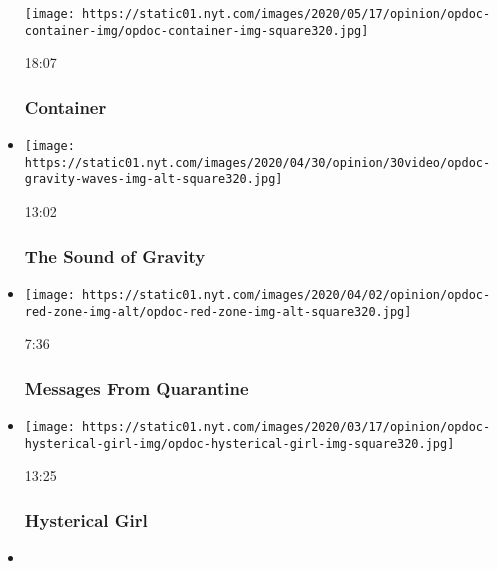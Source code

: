 \begin{itemize}
  \texttt{[image: https://static01.nyt.com/images/2020/05/17/opinion/opdoc-container-img/opdoc-container-img-square320.jpg]}

  18:07

  \hypertarget{container}{%
  \subsubsection{Container}\label{container}}
\item
  \href{https://www.nytimes.com/video/opinion/100000006819172/the-sound-of-gravity.html?action=click\&module=video-series-bar\&region=header\&pgtype=Article\&playlistId=video/op-docs}{}

  \texttt{[image: https://static01.nyt.com/images/2020/04/30/opinion/30video/opdoc-gravity-waves-img-alt-square320.jpg]}

  13:02

  \hypertarget{the-sound-of-gravity}{%
  \subsubsection{The Sound of Gravity}\label{the-sound-of-gravity}}
\item
  \href{https://www.nytimes.com/video/opinion/100000007062353/coronavirus-messages-from-quarantine.html?action=click\&module=video-series-bar\&region=header\&pgtype=Article\&playlistId=video/op-docs}{}

  \texttt{[image: https://static01.nyt.com/images/2020/04/02/opinion/opdoc-red-zone-img-alt/opdoc-red-zone-img-alt-square320.jpg]}

  7:36

  \hypertarget{messages-from-quarantine}{%
  \subsubsection{Messages From
  Quarantine}\label{messages-from-quarantine}}
\item
  \href{https://www.nytimes.com/video/opinion/100000007026836/hysterical-girl.html?action=click\&module=video-series-bar\&region=header\&pgtype=Article\&playlistId=video/op-docs}{}

  \texttt{[image: https://static01.nyt.com/images/2020/03/17/opinion/opdoc-hysterical-girl-img/opdoc-hysterical-girl-img-square320.jpg]}

  13:25

  \hypertarget{hysterical-girl}{%
  \subsubsection{Hysterical Girl}\label{hysterical-girl}}
\item
  \href{https://www.nytimes.com/video/opinion/100000007013675/self-quarantined-for-the-holidays.html?action=click\&module=video-series-bar\&region=header\&pgtype=Article\&playlistId=video/op-docs}{}


\end{itemize}
